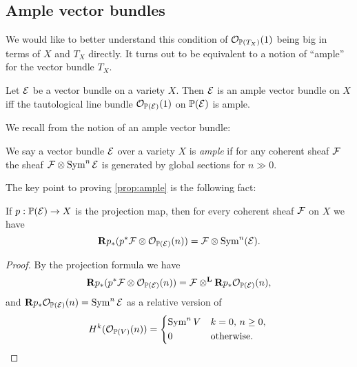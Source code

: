 \subsection{Ample vector bundles}

We would like to better understand this condition of $\mathcal{O}_{\mathbb{P}(T_X)}(1)$ being
big in terms of $X$ and $T_X$ directly. It turns out to be equivalent to a
notion of ``ample'' for the vector bundle $T_X$.

\begin{proposition} \label{prop:ample}
    Let $\mathcal{E}$ be a vector bundle on a variety $X$. Then $\mathcal{E}$ is an ample
    vector bundle on $X$ iff the tautological line bundle $\mathcal{O}_{\mathbb{P}(\mathcal{E})}(1)$ on
    $\mathbb{P}(\mathcal{E})$ is ample.
\end{proposition}

We recall from \cite{hartshorne_66} the notion of an ample vector bundle:

\begin{definition}
    We say a vector bundle $\mathcal{E}$ over a variety $X$ is \emph{ample} if for any
    coherent sheaf $\mathcal{F}$ the sheaf $\mathcal{F}\otimes\operatorname{Sym}^n\mathcal{E}$ is generated by
    global sections for $n\gg0$.
\end{definition}

The key point to proving \cref{prop:ample} is the following fact:

\begin{lemma}
    If $p:\mathbb{P}(\mathcal{E})\to X$ is the projection map, then for every coherent sheaf
    $\mathcal{F}$ on $X$ we have
    \begin{equation*}
        \mathbf{R} p_*(p^*\mathcal{F}\otimes\mathcal{O}_{\mathbb{P}(\mathcal{E})}(n))
            = \mathcal{F}\otimes\operatorname{Sym}^n(\mathcal{E}).
    \end{equation*}
\end{lemma}

\begin{proof}
    By the projection formula we have
    \begin{equation*}
        \mathbf{R} p_*(p^*\mathcal{F}\otimes\mathcal{O}_{\mathbb{P}(\mathcal{E})}(n))
            = \mathcal{F}\otimes^{\mathbf{L}}\mathbf{R} p_*\mathcal{O}_{\mathbb{P}(\mathcal{E})}(n),
    \end{equation*}
    and $\mathbf{R} p_*\mathcal{O}_{\mathbb{P}(\mathcal{E})}(n)=\operatorname{Sym}^n\mathcal{E}$ as a relative version of
    \begin{equation*}
        H^k(\O_{\P(V)}(n)) = \begin{dcases*}
            \Sym^nV & $k=0$, $n\ge0$, \\ %
            0 & otherwise.
        \end{dcases*}
    \end{equation*}
\end{proof}

